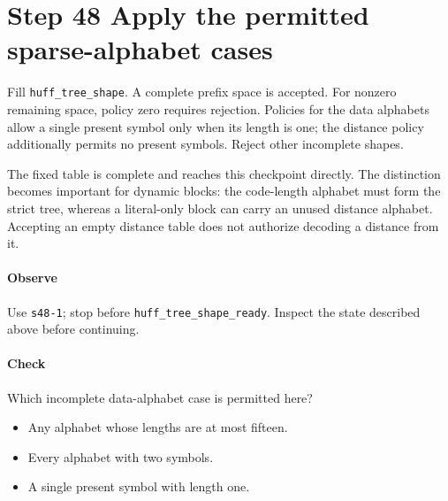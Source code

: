 \section{Step 48 Apply the permitted sparse-alphabet cases}\label{png-huff-s48}
Fill \texttt{huff\_tree\_shape}. A complete prefix space is accepted. For nonzero remaining space, policy zero requires rejection. Policies for the data alphabets allow a single present symbol only when its length is one; the distance policy additionally permits no present symbols. Reject other incomplete shapes.

The fixed table is complete and reaches this checkpoint directly. The distinction becomes important for dynamic blocks: the code-length alphabet must form the strict tree, whereas a literal-only block can carry an unused distance alphabet. Accepting an empty distance table does not authorize decoding a distance from it.

\paragraph{Observe} Use \texttt{s48-1}; stop before \texttt{huff\_tree\_shape\_ready}. Inspect the state described above before continuing.

\paragraph{Check} Which incomplete data-alphabet case is permitted here?
\begin{itemize}
  \item[A.] Any alphabet whose lengths are at most fifteen.
  \item[B.] Every alphabet with two symbols.
  \item[C.] A single present symbol with length one.
\end{itemize}
